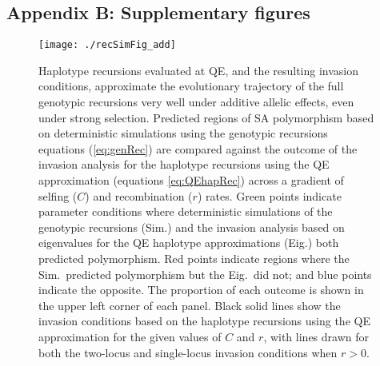 \documentclass{article}
\begin{document}
\subsection*{Appendix B: Supplementary figures}
\renewcommand{\theequation}{B\arabic{equation}}
\setcounter{equation}{0}
\renewcommand{\thefigure}{B\arabic{figure}}
\setcounter{figure}{0}

\begin{figure}[H]
\texttt{[image: ./recSimFig\_add]}
\caption{Haplotype recursions evaluated at QE, and the resulting invasion conditions, approximate the evolutionary trajectory of the full genotypic recursions very well under additive allelic effects, even under strong selection. Predicted regions of SA polymorphism based on deterministic simulations using the genotypic recursions equations (\ref{eq:genRec}) are compared against the outcome of the invasion analysis for the haplotype recursions using the QE approximation (equations \ref{eq:QEhapRec}) across a gradient of selfing ($C$) and recombination ($r$) rates. Green points indicate parameter conditions where deterministic simulations of the genotypic recursions (Sim.) and the invasion analysis based on eigenvalues for the QE haplotype approximations (Eig.) both predicted polymorphism. Red points indicate regions where the Sim.~predicted polymorphism but the Eig.~did not; and blue points indicate the opposite. The proportion of each outcome is shown in the upper left corner of each panel. Black solid lines show the invasion conditions based on the haplotype recursions using the QE approximation for the given values of $C$ and $r$, with lines drawn for both the two-locus and single-locus invasion conditions when $r > 0$.}
\label{fig:addSim}
\end{figure}
\newpage{}
\end{document}
